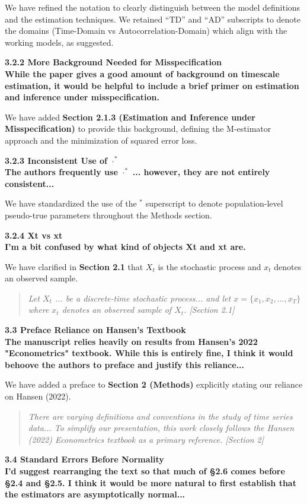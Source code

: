 \documentclass[docs/main.tex]{subfiles}
\newcommand{\reviewercomment}[1]{\vspace{0.3cm}\noindent\textbf{#1}\vspace{0.15cm}}
\newcommand{\manuscriptquote}[1]{\begin{quote}\textit{#1}\end{quote}}
\begin{document}
We have refined the notation to clearly distinguish between the model definitions and the estimation techniques. We retained ``TD'' and ``AD'' subscripts to denote the domains (Time-Domain vs Autocorrelation-Domain) which align with the working models, as suggested.

\reviewercomment{3.2.2 More Background Needed for Misspecification\\
While the paper gives a good amount of background on timescale estimation, it would be helpful to include a brief primer on estimation and inference under misspecification.}

We have added \textbf{Section 2.1.3 (Estimation and Inference under Misspecification)} to provide this background, defining the M-estimator approach and the minimization of squared error loss.

\reviewercomment{3.2.3 Inconsistent Use of $\cdot^*$\\
The authors frequently use $\cdot^*$ ... however, they are not entirely consistent...}

We have standardized the use of the $^*$ superscript to denote population-level pseudo-true parameters throughout the Methods section.

\reviewercomment{3.2.4 Xt vs xt\\
I’m a bit confused by what kind of objects Xt and xt are.}

We have clarified in \textbf{Section 2.1} that $X_t$ is the stochastic process and $x_t$ denotes an observed sample.

\manuscriptquote{Let $X_t$ ... be a discrete-time stochastic process... and let $x = \{x_1, x_2, . . . , x_T\}$ where $x_t$ denotes an observed sample of $X_t$. [Section 2.1]}

\reviewercomment{3.3 Preface Reliance on Hansen’s Textbook\\
The manuscript relies heavily on results from Hansen’s 2022 "Econometrics" textbook. While this is entirely fine, I think it would behoove the authors to preface and justify this reliance...}

We have added a preface to \textbf{Section 2 (Methods)} explicitly stating our reliance on Hansen (2022).

\manuscriptquote{There are varying definitions and conventions in the study of time series data... To simplify our presentation, this work closely follows the Hansen (2022) Econometrics textbook as a primary reference. [Section 2]}

\reviewercomment{3.4 Standard Errors Before Normality\\
I’d suggest rearranging the text so that much of §2.6 comes before §2.4 and §2.5. I think it would be more natural to first establish that the estimators are asymptotically normal...}
\end{document}
